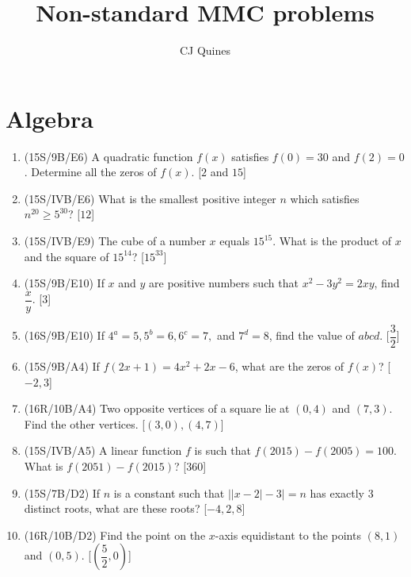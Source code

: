 \documentclass[11pt,paper=letter]{scrartcl}
\begin{document}
\title{Non-standard MMC problems}
\author{CJ Quines}
\date{}
\maketitle

\section{Algebra}

\begin{enumerate}

\item (15S/9B/E6) A quadratic function $f(x)$ satisfies $f(0) = 30$ and $f(2) = 0$. Determine all the zeros of $f(x)$. \hfill [$2$ and $15$]

\item (15S/IVB/E6) What is the smallest positive integer $n$ which satisfies $n^{20} \geq 5^{30}$? \hfill [$12$]

\item (15S/IVB/E9) The cube of a number $x$ equals $15^{15}$. What is the product of $x$ and the square of $15^{14}$? \hfill [$15^{33}$]

\item (15S/9B/E10) If $x$ and $y$ are positive numbers such that $x^2 - 3y^2 = 2xy$, find $\dfrac{x}{y}$. \hfill [$3$]

\item (16S/9B/E10) If $4^a = 5, 5^b = 6, 6^c = 7,$ and $7^d = 8$, find the value of $abcd$. \hfill [$\dfrac{3}{2}$]

\item (15S/9B/A4) If $f(2x + 1) = 4x^2 + 2x - 6$, what are the zeros of $f(x)$? \hfill [$-2, 3$]

\item (16R/10B/A4) Two opposite vertices of a square lie at $(0, 4)$ and $(7, 3)$. Find the other vertices. \phantom{.} \hfill [$(3, 0), (4, 7)$]

\item (15S/IVB/A5) A linear function $f$ is such that $f(2015) - f(2005) = 100$. What is $f(2051) - f(2015)$? \hfill [$360$]

\item (15S/7B/D2) If $n$ is a constant such that $\left| |x - 2| - 3 \right| = n$ has exactly $3$ distinct roots, what are these roots? \hfill [$-4, 2, 8$]

\item (16R/10B/D2) Find the point on the $x$-axis equidistant to the points $(8, 1)$ and $(0, 5)$. \hfill [$(\dfrac{5}{2} ,0)$]


\end{enumerate}
\end{document}
